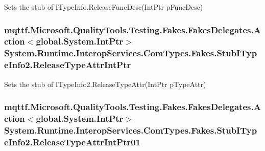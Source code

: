 Sets the stub of I\-Type\-Info.\-Release\-Func\-Desc(\-Int\-Ptr p\-Func\-Desc)

\hypertarget{class_system_1_1_runtime_1_1_interop_services_1_1_com_types_1_1_fakes_1_1_stub_i_type_info2_a00ee6476cdc0f704d5547093cba750f3}{
\subsubsection[{Release\-Type\-Attr\-Int\-Ptr}]{\setlength{\rightskip}{0pt plus 5cm}mqttf.\-Microsoft.\-Quality\-Tools.\-Testing.\-Fakes.\-Fakes\-Delegates.\-Action$<$global.\-System.\-Int\-Ptr$>$ System.\-Runtime.\-Interop\-Services.\-Com\-Types.\-Fakes.\-Stub\-I\-Type\-Info2.\-Release\-Type\-Attr\-Int\-Ptr}}\label{class_system_1_1_runtime_1_1_interop_services_1_1_com_types_1_1_fakes_1_1_stub_i_type_info2_a00ee6476cdc0f704d5547093cba750f3}


Sets the stub of I\-Type\-Info2.\-Release\-Type\-Attr(\-Int\-Ptr p\-Type\-Attr)

\hypertarget{class_system_1_1_runtime_1_1_interop_services_1_1_com_types_1_1_fakes_1_1_stub_i_type_info2_ad1b02c15e725fbcce486c527e305db6a}{
\subsubsection[{Release\-Type\-Attr\-Int\-Ptr01}]{\setlength{\rightskip}{0pt plus 5cm}mqttf.\-Microsoft.\-Quality\-Tools.\-Testing.\-Fakes.\-Fakes\-Delegates.\-Action$<$global.\-System.\-Int\-Ptr$>$ System.\-Runtime.\-Interop\-Services.\-Com\-Types.\-Fakes.\-Stub\-I\-Type\-Info2.\-Release\-Type\-Attr\-Int\-Ptr01}}\label{class_system_1_1_runtime_1_1_interop_services_1_1_com_types_1_1_fakes_1_1_stub_i_type_info2_ad1b02c15e725fbcce486c527e305db6a}


